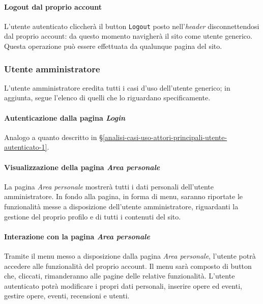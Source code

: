 \paragraph{Logout dal proprio account}
\label{analisi-casi-uso-attori-principali-utente-autenticato-12}
L'utente autenticato cliccherà il button \texttt{Logout} posto nell'\textit{header} disconnettendosi dal proprio account: da questo momento navigherà il sito come utente generico. Questa operazione può essere effettuata da qualunque pagina del sito.


\subsubsection{Utente amministratore}
\label{analisi-casi-uso-attori-principali-utente-amministratore}
L'utente amministratore eredita tutti i casi d'uso dell'utente generico; in aggiunta, segue l'elenco  di quelli che lo riguardano specificamente.


\paragraph{Autenticazione dalla pagina \textit{Login}}
\label{analisi-casi-uso-attori-principali-utente-amministratore-1}
Analogo a quanto descritto in §\ref{analisi-casi-uso-attori-principali-utente-autenticato-1}.


\paragraph{Visualizzazione della pagina \textit{Area personale}}
\label{analisi-casi-uso-attori-principali-utente-amministratore-2}
La pagina \textit{Area personale} mostrerà tutti i dati personali dell'utente amministratore. In fondo alla pagina, in forma di menu, saranno riportate le funzionalità messe a disposizione dell'utente amministratore, riguardanti la gestione del proprio profilo e di tutti i contenuti del sito.


\paragraph{Interazione con la pagina \textit{Area personale}}
\label{analisi-casi-uso-attori-principali-utente-amministratore-3}
Tramite il menu messo a disposizione dalla pagina \textit{Area personale}, l'utente potrà accedere alle funzionalità del proprio account. Il menu sarà composto di button che, cliccati, rimanderanno alle pagine delle relative funzionalità. L'utente autenticato potrà modificare i propri dati personali, inserire opere ed eventi, gestire opere, eventi, recensioni e utenti.


